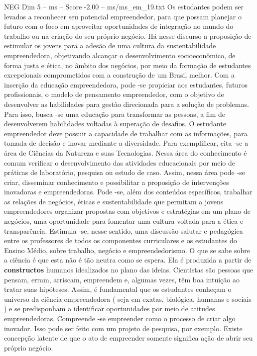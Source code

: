 \begin{textsample}{NEG Dim 5 – ms – Score -2.00 – ms/ms\_em\_19.txt}
Os estudantes podem ser levados a reconhecer seu potencial empreendedor, para que possam planejar o futuro com o foco em aproveitar oportunidades de integração no mundo do trabalho ou na criação do seu próprio negócio.
Há nesse discurso a proposição de estimular os jovens para a adesão de uma cultura da sustentabilidade empreendedora, objetivando alcançar o desenvolvimento socioeconômico, de forma justa e ética, no âmbito dos negócios, por meio da formação de estudantes excepcionais comprometidos com a construção de um Brasil melhor.
Com a inserção da educação empreendedora, pode -se propiciar aos estudantes, futuros profissionais, o modelo de pensamento empreendedor, com o objetivo de desenvolver as habilidades para gestão direcionada para a solução de problemas.
Para isso, busca -se uma educação para transformar as pessoas, a fim de desenvolverem habilidades voltadas à superação de desafios.
O estudante empreendedor deve possuir a capacidade de trabalhar com as informações, para tomada de decisão e inovar mediante a diversidade.
Para exemplificar, cita -se a área de Ciências da Natureza e suas Tecnologias.
Nessa área do conhecimento é comum verificar o desenvolvimento das atividades educacionais por meio de práticas de laboratório, pesquisa ou estudo de caso.
Assim, nessa área pode -se criar, disseminar conhecimento e possibilitar a proposição de intervenções inovadoras e empreendedoras.
Pode -se, além dos conteúdos específicos, trabalhar as relações de negócios, éticas e sustentabilidade que permitam a jovens empreendedores organizar propostas com objetivos e estratégias em um plano de negócios, uma oportunidade para fomentar uma cultura voltada para a ética e transparência.
Estimula -se, nesse sentido, uma discussão salutar e pedagógica entre os professores de todos os componentes curriculares e os estudantes do Ensino Médio, sobre trabalho, negócio e empreendedorismo.
O que se sabe sobre a ciência é que esta não é tão neutra como se espera.
Ela é produzida a partir de \textbf{constructos} humanos idealizados no plano das ideias.
Cientistas são pessoas que pensam, erram, arriscam, empreendem e, algumas vezes, têm boa intuição ao tratar suas hipóteses.
Assim, é fundamental que os estudantes conheçam o universo da ciência empreendedora ( seja em exatas, biológica, humanas e sociais ) e se predisponham a identificar oportunidades por meio de atitudes empreendedoras.
Compreende -se empreender como o processo de criar algo inovador.
Isso pode ser feito com um projeto de pesquisa, por exemplo.
Existe concepção latente de que o ato de empreender somente significa ação de abrir seu próprio negócio.

\end{textsample}
